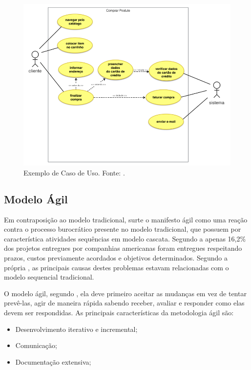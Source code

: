 \begin{figure}[H]
	\centering
	\includegraphics[width=1.0\textwidth]{figuras/caso_de_uso_exemplo.png}
	\caption{Exemplo de Caso de Uso. Fonte: .}
	\label{img:exemplo_caso_de_uso}
\end{figure}

\subsection{Modelo Ágil}
\label{sec:modelo_agil}

Em contraposição ao modelo tradicional, surte o manifesto ágil como uma reação contra o processo burocrático presente no modelo tradicional, que possuem por característica atividades sequências em modelo cascata. Segundo a  apenas 16,2\% dos projetos entregues por companhias americanas foram entregues respeitando prazos, custos previamente acordados e objetivos determinados. Segundo a própria , as principais causas destes problemas estavam relacionadas com o modelo sequencial tradicional.

O modelo ágil, segundo , ela deve primeiro aceitar as mudanças em vez de tentar prevê-las, agir de maneira rápida sabendo receber, avaliar e responder como elas devem ser respondidas. As principais características da metodologia ágil são:

\begin{itemize}
	\item Desenvolvimento iterativo e incremental;
	\item Comunicação;
	\item Documentação extensiva; 
\end{itemize}

